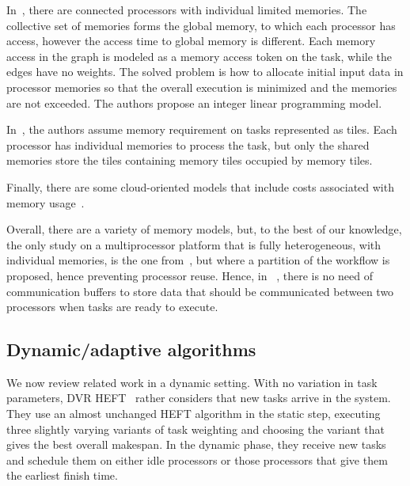 \documentclass[conference]{IEEEtran}
\begin{document}
    In~\cite{ding2024ils}, there are connected processors with individual limited memories.
    The collective set of memories forms the global memory, to which each processor has access, however the access time
    to global memory is different.
    Each memory access in the graph is modeled as a memory access token on the task, while the edges have no weights.
    The solved problem is how to allocate initial input data in processor memories so that the overall
    execution is minimized and the memories are not exceeded.
    The authors propose an integer linear programming model.

    In~\cite{rodriguez2019exploration}, the authors assume memory requirement on tasks represented as tiles.
    Each processor has individual memories to process the task, but only the shared memories store the tiles containing
    memory tiles occupied by memory tiles.

   Finally, there are some cloud-oriented models that include costs associated with memory usage~\cite{liang2020memory}.
   
   Overall, there are a variety of memory models, but, to the best of our knowledge, the only study on a multiprocessor
   platform that is fully heterogeneous, with individual memories, is the one from~\cite{DBLP:conf/icpp/KulaginaMB24},
   but where a partition of the workflow is proposed, hence preventing processor reuse. 
   Hence, in ~\cite{DBLP:conf/icpp/KulaginaMB24}, there is no need of communication buffers to store data 
   that should be communicated
   between two processors when tasks are ready to execute. 


    \subsection{Dynamic/adaptive algorithms}

We now review related work in a dynamic setting. With no variation in task parameters, 
    DVR HEFT~\cite{SANDOKJI2019482} rather considers that new tasks arrive in the system. 
    They use an almost unchanged HEFT algorithm in the static step, executing three slightly
    varying variants of task weighting and choosing the variant that gives the best overall makespan.
    In the dynamic phase, they receive new tasks and schedule them on either idle processors or 
    those processors that give them
    the earliest finish time.
\end{document}
